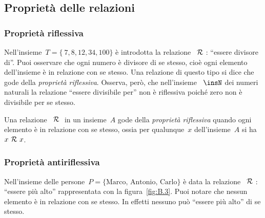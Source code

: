 \subsection{Proprietà delle relazioni}
\label{subsec:rel_proprieta}

\subsubsection{Proprietà riflessiva}

 \begin{esempio}

Nell'insieme~\(T = \lbrace~7, 8, 12, 34, 100 \rbrace\) è introdotta la 
relazione~\(~\mathcal{R}~\): ``essere divisore di''.
Puoi osservare che ogni numero è divisore di se stesso, cioè ogni elemento 
dell'insieme è in relazione
con se stesso. Una relazione di questo tipo si dice che gode della 
\emph{proprietà riflessiva}.
Osserva, però, che nell'insieme ~\(\insN\) dei numeri naturali la relazione 
``essere divisibile per'' non è riflessiva poiché zero non è divisibile per se 
stesso.
 \end{esempio}

\begin{definizione}
Una relazione~\(~\mathcal{R}~\) in un insieme~\(A\) gode della \emph{proprietà 
riflessiva} 
quando ogni elemento è in relazione con se stesso, ossia per qualunque~\(x\)
dell'insieme~\(A\) si ha~\(x ~\mathcal{R}~ x\).
\end{definizione}


\subsubsection{Proprietà antiriflessiva}

 \begin{esempio}
Nell'insieme delle persone~\(P = \lbrace\text{Marco, Antonio, Carlo}\rbrace\) è 
data la relazione~\(~\mathcal{R}~\): ``essere più alto''
rappresentata con la figura~\ref{fig:B.3}.
Puoi notare che nessun elemento è in relazione con se stesso. In effetti 
nessuno 
può ``essere più alto'' di se stesso.

 \end{esempio}


